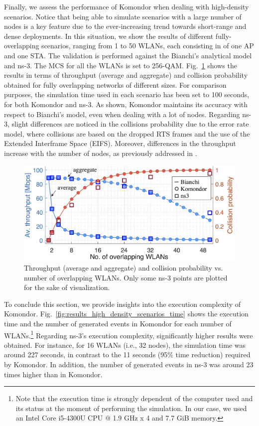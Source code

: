 \documentclass[conference]{IEEEtran}
\begin{document}
	Finally, we assess the performance of Komondor when dealing with high-density scenarios. Notice that being able to simulate scenarios with a large number of nodes is a key feature due to the ever-increasing trend towards short-range and dense deployments. In this situation, we show the results of different fully-overlapping scenarios, ranging from 1 to 50 WLANs, each consisting in of one AP and one STA. The validation is performed against the Bianchi's analytical model and ns-3. The MCS for all the WLANs is set to 256-QAM. Fig.~\ref{fig:results_high_density_scenarios_throughput} shows the results in terms of throughput (average and aggregate) and collision probability obtained for fully overlapping networks of different sizes. For comparison purposes, the simulation time used in each scenario has been set to 100 seconds, for both Komondor and ns-3. As shown, Komondor maintains its accuracy with respect to Bianchi's model, even when dealing with a lot of nodes. Regarding ns-3, slight differences are noticed in the collisions probability due to the error rate model, where collisions are based on the dropped RTS frames and the use of the Extended Interframe Space (EIFS). Moreover, differences in the throughput increase with the number of nodes, as previously addressed in \cite{patidar2017validation}.
	
	\begin{figure}[t]
		\centering	
		\includegraphics[width=1\columnwidth]{results_scenario_3.png}
		\caption{Throughput (average and aggregate) and collision probability vs. number of overlapping WLANs. Only some ns-3 points are plotted for the sake of visualization.}
		\label{fig:results_high_density_scenarios_throughput}
	\end{figure}
	\label{section:density}
	
	To conclude this section, we provide insights into the execution complexity of Komondor. Fig.~\ref{fig:results_high_density_scenarios_time} shows the execution time and the number of generated events in Komondor for each number of WLANs.\footnote{Note that the execution time is strongly dependent of the computer used and its status at the moment of performing the simulation. In our case, we used an Intel Core i5-4300U CPU @ 1.9 GHz x 4 and 7.7 GiB memory.} Regarding ns-3's execution complexity, significantly higher results were obtained. For instance, for 16 WLANs (i.e., 32 nodes), the simulation time was around 227 seconds, in contrast to the 11 seconds (95\% time reduction) required by Komondor. In addition, the number of generated events in ns-3 was around 23 times higher than in Komondor.
	
\end{document}
